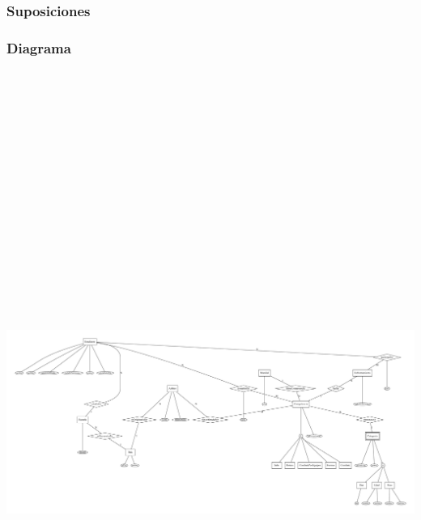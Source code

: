 
\subsubsection{Suposiciones}

\subsubsection{Diagrama}

\newpage

\noindent
\includegraphics[angle=90,height=23cm]{../mer/mer-dot.pdf}


